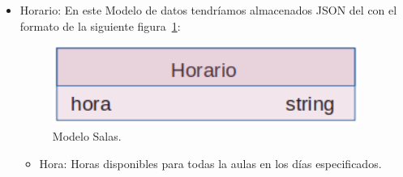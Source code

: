 \documentclass[a4paper, 12pt]{book}
\begin{document}
\begin{itemize}
	\item Horario: En este Modelo de datos tendríamos almacenados JSON del con el formato de la siguiente figura~\ref{fig:mongoDBHorario}:
	\begin{figure}[h!]
  	\centering
  	\includegraphics[width=10cm, keepaspectratio]{img/mongoDBHorario.png}
  	\caption{Modelo Salas.}\label{fig:mongoDBHorario}
	\end{figure}
	\begin{itemize}
		\item Hora: Horas disponibles para todas la aulas en los días especificados.
	\end{itemize}
\end{itemize}
\end{document}
